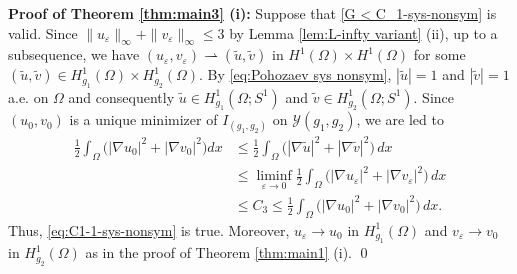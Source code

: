 \documentclass[a4paper,10pt,reqno]{amsart}
\theoremstyle{definition}
\newcommand{\calY}{{\mathcal Y}}
\newcommand{\tilu}{{\widetilde u}}
\newcommand{\tilv}{{\widetilde v}}
\newcommand{\ve}{{\varepsilon}}
\newcommand{\Om}{{\Omega}}
\numberwithin{equation}{section}
\begin{document}
 \bigskip
{\bf Proof of Theorem \ref{thm:main3} (i): }
Suppose that \eqref{G < C_1-sys-nonsym} is valid.
Since $ \| u_\ve \|_\infty + \| v_\ve \|_\infty \leq 3$ by Lemma \ref{lem:L-infty variant} (ii), up to a subsequence, we have
$(u_\ve,v_\ve ) \rightharpoonup (\tilde{u},\tilv) $ in $H^1 (\Omega) \times H^1(\Omega)$ for some $(\tilu ,\tilv) \in H^1_{g_1}(\Omega) \times  H^1_{g_2}(\Omega)$.
By \eqref{eq:Pohozaev sys nonsym},  $|\tilu | =1$ and  $|\tilv | =1$ a.e. on $\Om$ and consequently $ {\tilde{ u}} \in H^1_{g_1}(\Om; S^1)$ and $ {\tilde{ v}} \in H^1_{g_2} (\Om; S^1)$.
Since $(u_0,v_0)$ is a unique minimizer of $I_{(g_1,g_2)}$ on $\calY(g_1,g_2)$, we are led to 
\begin{align*}
\frac{1}{2} \int_\Omega  \big( |\nabla u_0|^2+|\nabla v_0 |^2 \big) dx & \leq \frac{1}{2} \int_\Omega  \big( |\nabla \tilu|^2+|\nabla \tilv |^2 \big)\,dx \\
& \leq \liminf_{\ve \to 0}  \frac{1}{2}\int_\Omega  \big( |\nabla u_\ve|^2+|\nabla v_\ve |^2 \big) \,dx \\
&\leq C_3 \le
\frac{1}{2} \int_\Omega \big( |\nabla u_0|^2 + |\nabla v_0|^2 \big)\, dx  .
\end{align*} 
Thus, \eqref{eq:C1-1-sys-nonsym}  is true.
Moreover,   $u_\ve \to u_0$ in $H_{g_1}^1(\Om)$ and  $v_\ve \to v_0$ in $H_{g_2}^1(\Om)$ as in the proof of Theorem \ref{thm:main1} (i).
\qed \\
\smallskip
\end{document}
